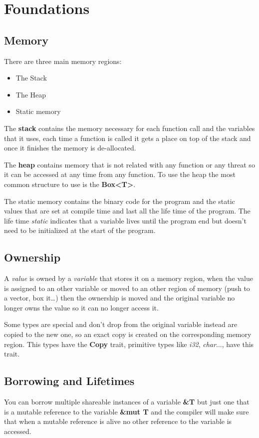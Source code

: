 \section{Foundations}

\subsection{Memory}

There are three main memory regions:

\begin{itemize}
    \item The Stack
    \item The Heap
    \item Static memory
\end{itemize}

The \textbf{stack} contains the memory necessary for each function call and the variables that it uses,
each time a function is called it gets a place on top of the stack and once it finishes the memory is de-allocated.

The \textbf{heap} contains memory that is not related with any function or any threat so it can be accessed at any time from any function.
To use the heap the most common structure to use is the \textbf{Box<T>}.

The static memory contains the binary code for the program and the static values that are set at compile time and last all the life time of the program.
The life time \textit{static} indicates that a variable lives until the program end but doesn't need to be initialized at the start of the program.

\subsection{Ownership}

A \textit{value} is owned by a \textit{variable} that stores it on a memory region,
when the value is assigned to an other variable or moved to an other region of memory (push to a vector, box it…)
then the ownership is moved and the original variable no longer owns the value so it can no longer access it.

Some types are special and don't drop from the original variable instead are copied to the new one,
so an exact copy is created on the corresponding memory region.
This types have the \textbf{Copy} trait, primitive types like \textit{i32}, \textit{char}$\dots$, have this trait.

\subsection{Borrowing and Lifetimes}

You can borrow multiple shareable instances of a variable \textbf{\&T} but just one that is a mutable reference to the variable \textbf{\&mut T}
and the compiler will make sure that when a mutable reference is alive no other reference to the variable is accessed.